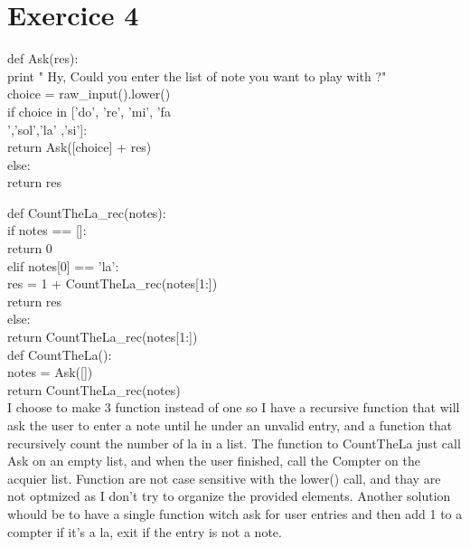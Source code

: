 \documentclass[a4paper,11pt]{article}
\begin{document}
\section{Exercice 4}

def Ask(res): \\
  print " Hy, Could you enter the list of note you want to play with ?" \\
  choice = raw\_input().lower() \\
  if choice in ['do', 're', 'mi', 'fa \\','sol','la' ,'si']: \\
    return Ask([choice] + res) \\
  else: \\
    return res \

def CountTheLa\_rec(notes): \\
  if notes == []: \\
    return 0 \\
  elif notes[0] == 'la': \\
    res = 1 + CountTheLa\_rec(notes[1:]) \\
    return res \\
  else: \\
    return CountTheLa\_rec(notes[1:]) \\

def CountTheLa():\\
  notes = Ask([])\\
  return CountTheLa\_rec(notes)\\

I choose to make 3 function instead of one so I have a recursive function that will ask the user to enter a note until he under an unvalid entry, and a function that recursively count the number of la in a list.
The function to CountTheLa just call Ask on an empty list, and when the user finished, call the Compter on the acquier list. Function are not case sensitive with the lower() call, and thay are not optmized as I don't try to organize the provided elements. Another solution whould be to have a single function witch ask for user entries and then add 1 to a compter if it's a la, exit if the entry is not a note.
\end{document}
